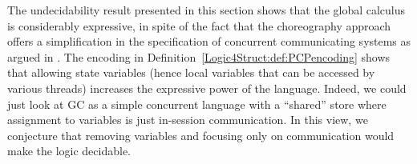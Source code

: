 \begin{remark}\label{Logic4Struct:remark:vars}
  The undecidability result presented in this section shows that the
  global calculus is considerably expressive, in spite of the fact
  that the choreography approach offers a simplification in the
  specification of concurrent communicating systems as argued in
  \cite{carbone7scc}. The encoding in
  Definition~\ref{Logic4Struct:def:PCPencoding} shows that allowing
  state variables (hence local variables that can be accessed by
  various threads) increases the expressive power of the
  language. Indeed, we could just look at GC as a simple concurrent
  language with a ``shared'' store where assignment to variables is
  just in-session communication. In this view, we conjecture that
  removing variables and focusing only on communication would make the
  logic decidable.
\end{remark}

